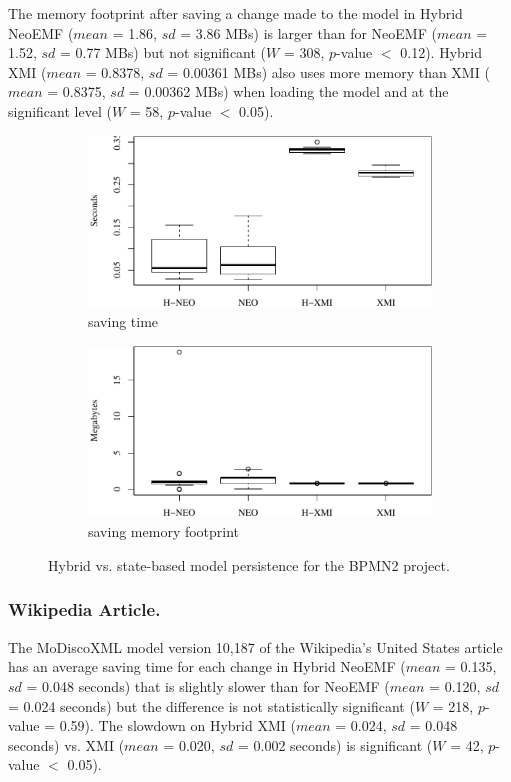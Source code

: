 \documentclass{llncs}
\begin{document}
The memory footprint after saving a change made to the model in Hybrid NeoEMF ($mean$ = 1.86, $sd$ = 3.86 MBs) is larger than for NeoEMF ($mean$ = 1.52, $sd$ = 0.77 MBs) but not significant ($W$ = 308, $p$-value $<$ 0.12). Hybrid XMI ($mean$ = 0.8378, $sd$ = 0.00361 MBs) also uses more memory than XMI ($mean$ = 0.8375, $sd$ = 0.00362 MBs) when loading the model and at the significant level ($W$ = 58, $p$-value $<$ 0.05). 

\begin{figure}[ht]
    \begin{subfigure}{0.49\linewidth}
        \includegraphics[width=\linewidth]{images/save_time_bpmn2}
        \caption{saving time}
        \label{fig:save_time_bpmn2}
    \end{subfigure}
    \begin{subfigure}{0.49\linewidth}
        \includegraphics[width=\linewidth]{images/save_memory_bpmn2}
        \caption{saving memory footprint}
        \label{fig:save_memory_bpmn2}
    \end{subfigure}
\caption{Hybrid vs. state-based model persistence for the BPMN2 project.}
\end{figure}

\subsubsection{Wikipedia Article.}
\label{sec:model_saving_time_wikipedia}
The MoDiscoXML model version 10,187 of the Wikipedia's United States article has an average saving time for each change in Hybrid NeoEMF ($mean$ = 0.135, $sd$ = 0.048 seconds) that is slightly slower than for NeoEMF ($mean$ = 0.120, $sd$ = 0.024 seconds) but the difference is not statistically significant ($W$ = 218, $p$-value = 0.59). The slowdown on Hybrid XMI ($mean$ = 0.024, $sd$ = 0.048 seconds) vs. XMI ($mean$ = 0.020, $sd$ = 0.002 seconds) is significant ($W$ = 42, $p$-value $<$ 0.05).
\end{document}

